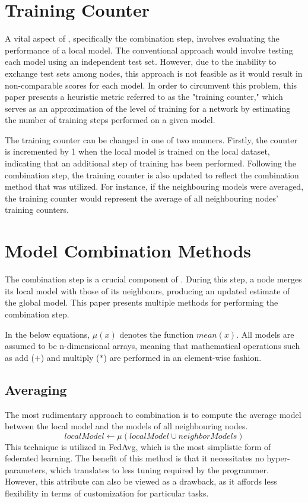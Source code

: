 \section{Training Counter}
A vital aspect of \SL, specifically the combination step, involves evaluating the performance of a local model. The conventional approach would involve testing each model using an independent test set. However, due to the inability to exchange test sets among nodes, this approach is not feasible as it would result in non-comparable scores for each model. In order to circumvent this problem, this paper presents a heuristic metric referred to as the "training counter," which serves as an approximation of the level of training for a network by estimating the number of training steps performed on a given model.

The training counter can be changed in one of two manners. Firstly, the counter is incremented by 1 when the local model is trained on the local dataset, indicating that an additional step of training has been performed. Following the combination step, the training counter is also updated to reflect the combination method that was utilized. For instance, if the neighbouring models were averaged, the training counter would represent the average of all neighbouring nodes' training counters.

\section{Model Combination Methods} \label{mcm}
The combination step is a crucial component of \SL. During this step, a node merges its local model with those of its neighbours, producing an updated estimate of the global model. This paper presents multiple methods for performing the combination step.

In the below equations, $\mu(x)$ denotes the function $mean(x)$. All models are assumed to be n-dimensional arrays, meaning that mathematical operations such as add ($+$) and multiply ($*$) are performed in an element-wise fashion.

\subsection{Averaging}
The most rudimentary approach to combination is to compute the average model between the local model and the models of all neighbouring nodes.
\[ localModel \gets \mu(localModel \cup neighborModels) \]
This technique is utilized in FedAvg, which is the most simplistic form of federated learning. The benefit of this method is that it necessitates no hyper-parameters, which translates to less tuning required by the programmer. However, this attribute can also be viewed as a drawback, as it affords less flexibility in terms of customization for particular tasks.

